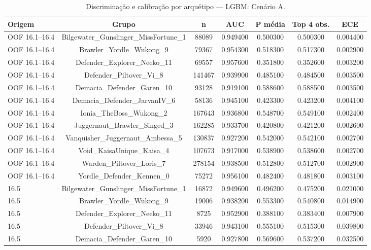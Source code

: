 \begin{table}[htbp]
\caption{Discriminação e calibração por arquétipo — LGBM: Cenário A.}
\label{tab:erros_arquetipo}
\centering
\small
\begin{tabular}{lcccccc}
\toprule
Origem & Grupo & n & AUC & P média & Top 4 obs. & ECE \\
\midrule
OOF 16.1–16.4 & Bilgewater\_Gunslinger\_MissFortune\_1 & 88089 & 0.949400 & 0.500300 & 0.500300 & 0.004400 \\
OOF 16.1–16.4 & Brawler\_Yordle\_Wukong\_9 & 79367 & 0.954300 & 0.518300 & 0.517300 & 0.002900 \\
OOF 16.1–16.4 & Defender\_Explorer\_Neeko\_11 & 69557 & 0.957600 & 0.351800 & 0.352600 & 0.003200 \\
OOF 16.1–16.4 & Defender\_Piltover\_Vi\_8 & 141467 & 0.939900 & 0.485100 & 0.484500 & 0.003500 \\
OOF 16.1–16.4 & Demacia\_Defender\_Garen\_10 & 93128 & 0.919100 & 0.588600 & 0.588500 & 0.003500 \\
OOF 16.1–16.4 & Demacia\_Defender\_JarvanIV\_6 & 58136 & 0.945100 & 0.423300 & 0.423200 & 0.004100 \\
OOF 16.1–16.4 & Ionia\_TheBoss\_Wukong\_2 & 167643 & 0.936800 & 0.548700 & 0.549100 & 0.002400 \\
OOF 16.1–16.4 & Juggernaut\_Brawler\_Singed\_3 & 162285 & 0.933700 & 0.420800 & 0.421200 & 0.002600 \\
OOF 16.1–16.4 & Vanquisher\_Juggernaut\_Ambessa\_5 & 130837 & 0.927200 & 0.542000 & 0.542100 & 0.002700 \\
OOF 16.1–16.4 & Void\_KaisaUnique\_Kaisa\_4 & 107673 & 0.917000 & 0.538900 & 0.538600 & 0.002700 \\
OOF 16.1–16.4 & Warden\_Piltover\_Loris\_7 & 278154 & 0.938500 & 0.512800 & 0.512700 & 0.002900 \\
OOF 16.1–16.4 & Yordle\_Defender\_Kennen\_0 & 75272 & 0.956100 & 0.482400 & 0.481800 & 0.003100 \\
16.5 & Bilgewater\_Gunslinger\_MissFortune\_1 & 16872 & 0.949600 & 0.496200 & 0.475200 & 0.021000 \\
16.5 & Brawler\_Yordle\_Wukong\_9 & 19006 & 0.938200 & 0.553300 & 0.540800 & 0.014900 \\
16.5 & Defender\_Explorer\_Neeko\_11 & 8725 & 0.952900 & 0.388100 & 0.383400 & 0.007900 \\
16.5 & Defender\_Piltover\_Vi\_8 & 33946 & 0.943100 & 0.555100 & 0.515300 & 0.039800 \\
16.5 & Demacia\_Defender\_Garen\_10 & 5920 & 0.927800 & 0.569600 & 0.537200 & 0.032500 \\

\end{tabular}
\end{table}
